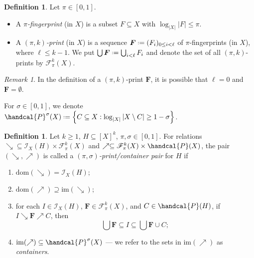 \documentclass[12pt,reqno]{amsart}
\theoremstyle{plain}
\theoremstyle{definition}
\newtheorem{defn}[equation]{Definition}
\theoremstyle{remark}
\newtheorem{remark}[equation]{Remark}
\newcommand{\0}{\mathbb{\emptyset}}
\newcommand{\Pow}{\handcal{P}}
\newcommand{\set}[1]{\left\{ #1 \right\}}
\newcommand*{\defeq}{\mathrel{\vcenter{\baselineskip0.5ex \lineskiplimit0pt \hbox{\scriptsize.}\hbox{\scriptsize.}}}=}
\newcommand{\si}{\sigma}
\newcommand{\FC}{\mathcal{F}}
\newcommand{\IC}{\mathcal{I}}
\newcommand{\dom}{\mathrm{dom}}
\newcommand{\im}{\mathrm{im}}
\newcommand{\logX}{\log_{|X|}}
\newcommand{\Prints}[1][k]{\FC_\pi^{#1}(X)}
\newcommand{\Print}{\boldsymbol{F}}
\newcommand{\prel}{\searrow}
\newcommand{\crel}{\nearrow}
\begin{document}
\begin{defn}\label{defn:fingerprint}
	Let $\pi \in [0,1]$.
	
	\begin{itemize}
		\item A \emph{$\pi$-fingerprint} (in $X$) is a subset $F \subseteq X$ with $\logX |F| \le \pi$.
		
		\item A \emph{$(\pi, k)$-print} (in $X$) is a sequence $\Print \defeq (F_i)_{0 \le i < \ell}$ of $\pi$-fingerprints (in $X$), where $\ell \leq k-1$. We put $\bigcup \Print \defeq \bigcup_{i < \ell} F_i$ and denote the set of all $(\pi, k)$-prints by $\Prints$.
	\end{itemize}
\end{defn}

\begin{remark}
	In the definition of a $(\pi, k)$-print $\Print$, it is possible that $\ell = 0$ and $\Print = \0$.
\end{remark}

\noindent For $\si \in [0,1]$, we denote $\Pow^\si(X) \defeq \set{C \subseteq X : \logX |X \setminus C| \ge 1 - \si}$.

\begin{defn}\label{defn:print-container}
	Let $k \ge 1$, $H \subseteq [X]^k$, $\pi, \si \in [0,1]$. For relations $\prel \subseteq \IC_X(H) \times \Prints$ and $\crel \subseteq \Prints \times \Pow(X)$, the pair $(\prel,\crel)$ is called a \emph{$(\pi,\si)$-print/container pair} for $H$ if
	\begin{enumerate}[label=\textup{(\ref*{defn:print-container}.\roman*)}, itemsep=4pt,leftmargin=*,series=defn:print-container]
		\item \label{print-container:I_has_P} $\dom(\prel) = \IC_X(H)$;
		
		\item $\dom(\crel) \supseteq \im(\prel)$\label{print-container:P_has_C};
		
		\item \label{print-container:IPC} for each $I \in \IC_X(H)$, $\Print \in \Prints$, and $C \in \Pow(H)$, if $I \prel \Print \crel C$, then 
		\[
		\bigcup \Print \subseteq I \subseteq \bigcup \Print \cup C;
		\]
		
		\item \label{print-container:C_has_cologsize_si} $\im(\crel) \subseteq \Pow^\si(X)$ --- we refer to the sets in $\im(\crel)$ as \emph{containers}.
	\end{enumerate}
\end{defn}
\end{document}
